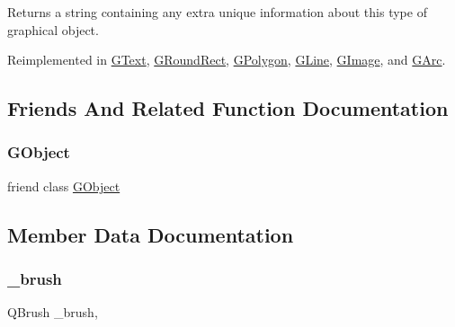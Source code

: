 Returns a string containing any extra unique information about this type of graphical object. 



Reimplemented in \mbox{\hyperlink{classsgl_1_1GText_a04364e674911906702b748deec32db18}{G\+Text}}, \mbox{\hyperlink{classsgl_1_1GRoundRect_a04364e674911906702b748deec32db18}{G\+Round\+Rect}}, \mbox{\hyperlink{classsgl_1_1GPolygon_a04364e674911906702b748deec32db18}{G\+Polygon}}, \mbox{\hyperlink{classsgl_1_1GLine_a04364e674911906702b748deec32db18}{G\+Line}}, \mbox{\hyperlink{classsgl_1_1GImage_a04364e674911906702b748deec32db18}{G\+Image}}, and \mbox{\hyperlink{classsgl_1_1GArc_a04364e674911906702b748deec32db18}{G\+Arc}}.



\subsection{Friends And Related Function Documentation}
\mbox{\label{classsgl_1_1GCompound_ac45aa544268532ae1e01fee410b917bf}} 
\subsubsection{\texorpdfstring{G\+Object}{GObject}}
{\footnotesize\ttfamily friend class \mbox{\hyperlink{classsgl_1_1GObject}{G\+Object}}\hspace{0.3cm}{\ttfamily [friend]}}



\subsection{Member Data Documentation}
\mbox{\label{classsgl_1_1GObject_aab24462ec896b596d99911767b0912d0}} 
\subsubsection{\texorpdfstring{\+\_\+brush}{\_brush}}
{\footnotesize\ttfamily Q\+Brush \+\_\+brush\hspace{0.3cm}{\ttfamily [protected]}, {\ttfamily [inherited]}}


